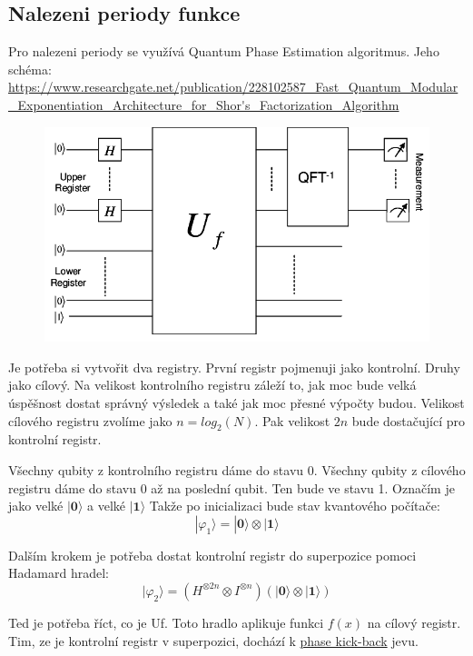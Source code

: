 \documentclass[11pt]{article}
\begin{document}
\subsection{Nalezeni periody funkce}
Pro nalezeni periody se využívá Quantum Phase Estimation algoritmus.
Jeho schéma:
\sloppy
\url{https://www.researchgate.net/publication/228102587_Fast_Quantum_Modular_Exponentiation_Architecture_for_Shor's_Factorization_Algorithm}
\begin{figure}[H]
    \includegraphics[scale=.5]{High-level-diagram-of-Shors-algorithm-Upper-register-consists-of-2n-qubits-and-holds}
    \centering
\end{figure}
\par Je potřeba si vytvořit dva registry. První registr pojmenuji jako kontrolní. Druhy jako cílový.
Na velikost kontrolního registru záleží to, jak moc bude velká úspěšnost dostat správný výsledek a také jak moc přesné výpočty budou.
Velikost cílového registru zvolíme jako $n = log_2(N)$.
Pak velikost $2n$ bude dostačující pro kontrolní registr.
\par Všechny qubity z kontrolního registru dáme do stavu $0$. Všechny qubity z cílového registru dáme do stavu $0$ až na poslední qubit. Ten bude ve stavu 1.
Označím je jako velké $|\textbf{0}\rangle$ a velké $|\textbf{1}\rangle$
Takže po inicializaci bude stav kvantového počítače:
$$|\varphi_1\rangle = |\textbf{0}\rangle\otimes|\textbf{1}\rangle$$
\par Dalším krokem je potřeba dostat kontrolní registr do superpozice pomoci Hadamard hradel:
$$|\varphi_2\rangle = (H^{\otimes 2n}\otimes I^{\otimes n})(|\textbf{0}\rangle\otimes|\textbf{1}\rangle)$$
\par Ted je potřeba říct, co je Uf. Toto hradlo aplikuje funkci $f(x)$ na cílový registr.
Tim, ze je kontrolní registr v superpozici, dochází k \hyperref[sec:phase_kickback]{phase kick-back} jevu.
\end{document}
